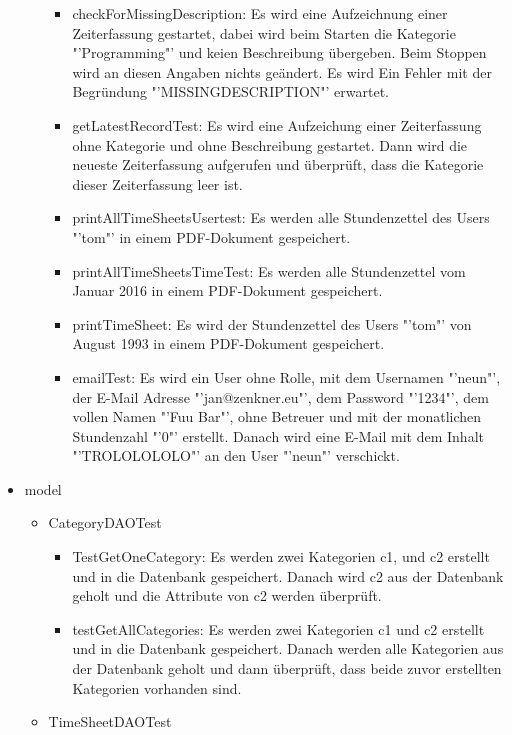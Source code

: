 \begin{itemize}
\begin{itemize}
\begin{itemize}
              \item checkForMissingDescription: Es wird eine Aufzeichnung einer Zeiterfassung gestartet, dabei wird beim Starten die Kategorie "'Programming"' und keien Beschreibung übergeben. Beim Stoppen wird an diesen Angaben nichts geändert. Es wird Ein Fehler mit der Begründung "'MISSINGDESCRIPTION"' erwartet.
              \item getLatestRecordTest: Es wird eine Aufzeichung einer Zeiterfassung ohne Kategorie und ohne Beschreibung gestartet. Dann wird die neueste Zeiterfassung aufgerufen und überprüft, dass die Kategorie dieser Zeiterfassung leer ist.
              \item printAllTimeSheetsUsertest: Es werden alle Stundenzettel des Users "'tom"' in einem PDF-Dokument gespeichert.
              \item printAllTimeSheetsTimeTest: Es werden alle Stundenzettel vom Januar 2016 in einem PDF-Dokument gespeichert.
              \item printTimeSheet: Es wird der Stundenzettel des Users "'tom"' von August 1993 in einem PDF-Dokument gespeichert.
		      \newpage
              \item emailTest: Es wird ein User ohne Rolle, mit dem Usernamen "'neun"', der E-Mail Adresse "'jan@zenkner.eu"', dem Password "'1234"', dem vollen Namen "'Fuu Bar"', ohne Betreuer und mit der monatlichen Stundenzahl "'0"' erstellt. Danach wird eine E-Mail mit dem Inhalt "'TROLOLOLOLO"' an den User "'neun"' verschickt.
            \end{itemize}
        \end{itemize}
    \item model         
      \begin{itemize}
        \item CategoryDAOTest
          \begin{itemize}
            \item TestGetOneCategory: Es werden zwei Kategorien c1, und c2 erstellt und in die Datenbank gespeichert. Danach wird c2 aus der Datenbank geholt und die Attribute von c2 werden überprüft.
            \item testGetAllCategories: Es werden zwei Kategorien c1 und c2 erstellt und in die Datenbank gespeichert. Danach werden alle Kategorien aus der Datenbank geholt und dann überprüft, dass beide zuvor erstellten Kategorien vorhanden sind.
          \end{itemize}
        \item TimeSheetDAOTest
          \begin{itemize}

\end{itemize}
\end{itemize}
\end{itemize}
